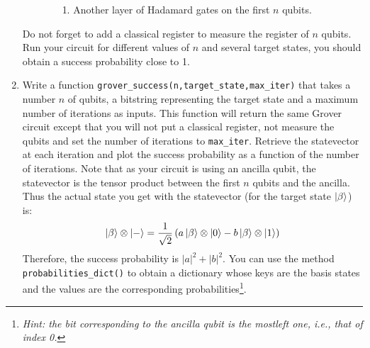\documentclass{article}
\begin{document}
\begin{enumerate}
\begin{enumerate}
\begin{enumerate}
\begin{enumerate}
                \item Another layer of Hadamard gates on the first $n$ qubits.
            \end{enumerate}
        \end{enumerate}
    \end{enumerate}
    Do not forget to add a classical register to measure the register of $n$ qubits. Run your circuit for different values of $n$ and several target states, you should obtain a success probability close to 1.
    \item Write a function \verb|grover_success(n,target_state,max_iter)| that takes a number $n$ of qubits, a bitstring representing the target state and a maximum number of iterations as inputs. This function will return the same Grover circuit except that you will not put a classical register, not measure the qubits and set the number of iterations to \verb|max_iter|. Retrieve the statevector at each iteration and plot the success probability as a function of the number of iterations. Note that as your circuit is using an ancilla qubit, the statevector is the tensor product between the first $n$ qubits and the ancilla. Thus the actual state you get with the statevector (for the target state $\ket{\beta}$) is:
    \begin{equation*}
        \ket{\beta}\otimes\ket{-} = \frac{1}{\sqrt{2}}\left(a\ket{\beta}\otimes\ket{0}-b\ket{\beta}\otimes\ket{1}\right)
    \end{equation*}
    Therefore, the success probability is $|a|^2+|b|^2$. You can use the method \verb|probabilities_dict()| to obtain a dictionary whose keys are the basis states and the values are the corresponding probabilities\footnote{\textit{Hint: the bit corresponding to the ancilla qubit is the mostleft one, i.e., that of index 0.}}.
\end{enumerate}




\end{document}
